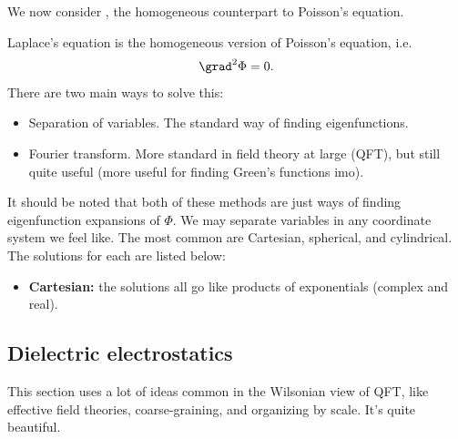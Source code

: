 \documentclass[11pt]{article}
\begin{document}
We now consider , the homogeneous counterpart
to Poisson's equation.

\begin{iidea}
    Laplace's equation is the homogeneous version of Poisson's
    equation, i.e.
    \begin{align*}
        \grad^2 \Phi = 0.
    \end{align*}
    There are two main ways to solve this:
    \begin{itemize}
        \item Separation of variables. The standard way of finding eigenfunctions.
        \item Fourier transform. More standard in field
        theory at large (QFT), but still quite useful
        (more useful for finding Green's functions imo).
    \end{itemize}
    It should be noted that both of these methods are just ways of
    finding eigenfunction expansions of $\Phi$. We may separate variables in 
    any coordinate system we feel like. The most common are Cartesian, spherical, 
    and cylindrical. The solutions for each are listed below:
    \begin{itemize}
        \item \textbf{Cartesian:} the solutions all go like products
        of exponentials (complex and real). 
    \end{itemize}
\end{iidea}


\begin{iidea}
\end{iidea}

\subsection{Dielectric electrostatics}

\begin{reemark}
    This section uses a lot of ideas common in the Wilsonian
    view of QFT, like effective field theories, coarse-graining,
    and organizing by scale. It's quite beautiful.
\end{reemark}
\end{document}
